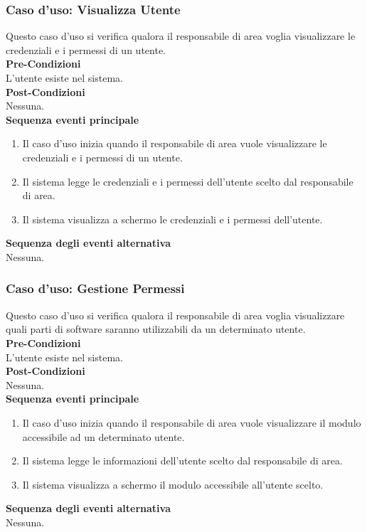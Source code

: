 \documentclass[green, fancy, 11pt]{elegantbook}
\begin{document}
\subsubsection{Caso d'uso: Visualizza Utente}
\noindent
Questo caso d’uso si verifica qualora il responsabile di area voglia visualizzare le credenziali e i permessi di un utente.\\
\textbf{Pre-Condizioni}\\
L’utente esiste nel sistema.\\
\textbf{Post-Condizioni}\\
Nessuna.\\
\textbf{Sequenza eventi principale}\\
\begin{enumerate}
	\item Il caso d’uso inizia quando il responsabile di area vuole visualizzare le credenziali e i permessi di un utente.
	\item Il sistema legge le credenziali e i permessi dell’utente scelto dal responsabile di area.
	\item Il sistema visualizza a schermo le credenziali e i permessi dell’utente.
\end{enumerate}
\textbf{Sequenza degli eventi alternativa}\\
Nessuna.

\subsubsection{Caso d'uso: Gestione Permessi}
\noindent
Questo caso d’uso si verifica qualora il responsabile di area voglia visualizzare quali parti di software saranno utilizzabili da un determinato utente.\\
\textbf{Pre-Condizioni}\\
L'utente esiste nel sistema.\\
\textbf{Post-Condizioni}\\
Nessuna.\\
\textbf{Sequenza eventi principale}\\
\begin{enumerate}
	\item Il caso d’uso inizia quando il responsabile di area vuole visualizzare il modulo accessibile ad un determinato utente.
	\item Il sistema legge le informazioni dell’utente scelto dal responsabile di area.
	\item Il sistema visualizza a schermo il modulo accessibile all’utente scelto.
\end{enumerate}
\textbf{Sequenza degli eventi alternativa}\\
Nessuna.
\end{document}
